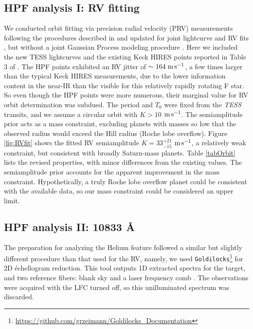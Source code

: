 \documentclass[twocolumn]{aastex631}
\newcommand{\ms}{\ensuremath{\rm m\,s^{-1}}}
\begin{document}
\subsection{HPF analysis I: RV fitting}\label{secRVfit}

We conducted orbit fitting via precision radial velocity (PRV) measurements following the procedures described in \citet{2021AJ....161..173T} and updated for joint lightcurve and RV fits \citep{2022AJ....163..225T}, but without a joint Gaussian Process modeling procedure \citep{2023ApJ...950..162T}.  Here we included the new TESS lightcurves and the existing Keck HIRES points reported in Table 3 of \citet{2017AJ....153..211Z}.  The HPF points exhibited an RV jitter of $\sim164\;\ms$, a few times larger than the typical Keck HIRES measurements, due to the lower information content in the near-IR than the visible for this relatively rapidly rotating F star.  So even though the HPF points were more numerous, their marginal value for RV orbit determination was subdued.  The period and $T_0$ were fixed from the \emph{TESS} transits, and we assume a circular orbit with $K>10$ \ms.  The semiamplitude prior acts as a mass constraint, excluding planets with masses so low that the observed radius would exceed the Hill radius (Roche lobe overflow).  Figure \ref{fig:RVfit} shows the fitted RV semiamplitude $K=33_{-15}^{+21}$ \ms, a relatively weak constraint, but consistent with broadly Saturn-mass planets.  Table \ref{tabOrbit} lists the revised properties, with minor differences from the existing values.  The semiamplitude prior accounts for the apparent improvement in the mass constraint.  Hypothetically, a truly Roche lobe overflow planet could be consistent with the available data, so our mass constraint could be considered an upper limit.


\subsection{HPF analysis II:  10833 \AA} \label{secHeAnalysis}
The preparation for analyzing the Helium feature followed a similar but slightly different procedure than that used for the RV, namely, we used \texttt{Goldilocks}\footnote{\url{https://github.com/grzeimann/Goldilocks_Documentation}} for 2D \'echellogram reduction.  This tool outputs 1D extracted spectra for the target, and two reference fibers: blank sky and a laser frequency comb \citep[LFC,][]{2019Optic...6..233M}.  The observations were acquired with the LFC turned off, so this unilluminated spectrum was discarded.
\end{document}
